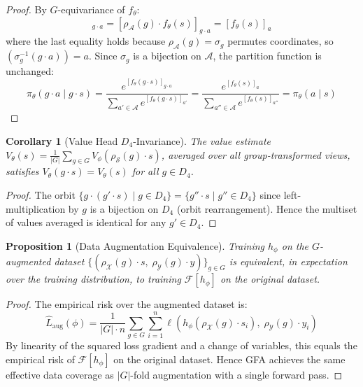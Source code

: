 \documentclass{article}
\newtheorem{corollary}[theorem]{Corollary}
\newtheorem{proposition}[theorem]{Proposition}
\begin{document}
\begin{proof}
By $G$-equivariance of $f_\theta$:
\begin{equation}
    [f_\theta(g \cdot s)]_{g \cdot a} = [\rho_\mathcal{A}(g) \cdot f_\theta(s)]_{g \cdot a} = [f_\theta(s)]_a
\end{equation}
where the last equality holds because $\rho_\mathcal{A}(g) = \sigma_g$ permutes coordinates, so $(\sigma_g^{-1}(g \cdot a)) = a$. Since $\sigma_g$ is a bijection on $\mathcal{A}$, the partition function is unchanged:
\begin{equation}
    \pi_\theta(g \cdot a \mid g \cdot s)
    = \frac{e^{[f_\theta(g \cdot s)]_{g \cdot a}}}{\sum_{a' \in \mathcal{A}} e^{[f_\theta(g \cdot s)]_{a'}}}
    = \frac{e^{[f_\theta(s)]_a}}{\sum_{a'' \in \mathcal{A}} e^{[f_\theta(s)]_{a''}}}
    = \pi_\theta(a \mid s)
\end{equation}
\end{proof}

\begin{corollary}[Value Head $D_4$-Invariance]\label{thm:value_inv}
The value estimate $V_\theta(s) = \frac{1}{|G|}\sum_{g \in G} V_\phi(\rho_\mathcal{S}(g) \cdot s)$, averaged over all group-transformed views, satisfies $V_\theta(g \cdot s) = V_\theta(s)$ for all $g \in D_4$.
\end{corollary}

\begin{proof}
The orbit $\{g \cdot (g' \cdot s) \mid g \in D_4\} = \{g'' \cdot s \mid g'' \in D_4\}$ since left-multiplication by $g$ is a bijection on $D_4$ (orbit rearrangement). Hence the multiset of values averaged is identical for any $g' \in D_4$.
\end{proof}

\begin{proposition}[Data Augmentation Equivalence]\label{prop:data_aug}
Training $h_\phi$ on the $G$-augmented dataset $\{(\rho_\mathcal{X}(g) \cdot s,\; \rho_\mathcal{Y}(g) \cdot y)\}_{g \in G}$ is equivalent, in expectation over the training distribution, to training $\mathcal{F}[h_\phi]$ on the original dataset.
\end{proposition}

\begin{proof}
The empirical risk over the augmented dataset is:
\begin{equation}
    \hat{L}_{\mathrm{aug}}(\phi) = \frac{1}{|G| \cdot n} \sum_{g \in G} \sum_{i=1}^n \ell\!\left(h_\phi(\rho_\mathcal{X}(g) \cdot s_i),\; \rho_\mathcal{Y}(g) \cdot y_i\right)
\end{equation}
By linearity of the squared loss gradient and a change of variables, this equals the empirical risk of $\mathcal{F}[h_\phi]$ on the original dataset. Hence GFA achieves the same effective data coverage as $|G|$-fold augmentation with a single forward pass.
\end{proof}
\end{document}
